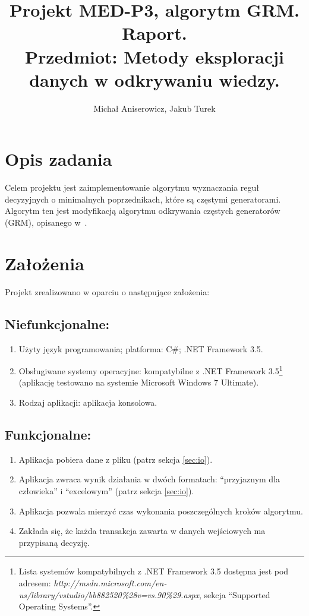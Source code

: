 \documentclass[a4paper,10pt]{article}
\title{Projekt MED-P3, algorytm GRM. Raport. \\ \small{Przedmiot: Metody eksploracji danych w odkrywaniu wiedzy.}}
\author{Michał Aniserowicz, Jakub Turek}
\date{}
\begin{document}
\maketitle

\section{Opis zadania} \label{sec:task_desc}
Celem projektu jest zaimplementowanie algorytmu wyznaczania reguł decyzyjnych o minimalnych poprzednikach, które są częstymi generatorami.
Algorytm ten jest modyfikacją algorytmu odkrywania częstych generatorów (GRM), opisanego w~\cite{grm}.



\section{Założenia} \label{sec:assumptions}
Projekt zrealizowano w oparciu o następujące założenia:

\subsection*{Niefunkcjonalne:}
 \begin{enumerate}
  \item Użyty język programowania; platforma: C\#; .NET Framework 3.5.
  \item Obsługiwane systemy operacyjne: kompatybilne z .NET Framework 3.5\footnote{Lista systemów kompatybilnych z .NET Framework 3.5 dostępna jest pod adresem: \emph{http://msdn.microsoft.com/en-us/library/vstudio/bb882520\%28v=vs.90\%29.aspx}, sekcja ``Supported Operating Systems''.} (aplikację testowano na systemie Microsoft Windows 7 Ultimate).
  \item Rodzaj aplikacji: aplikacja konsolowa.
\end{enumerate}

\subsection*{Funkcjonalne:}
 \begin{enumerate}
  \item Aplikacja pobiera dane z pliku (patrz sekcja \ref{sec:io}).
  \item Aplikacja zwraca wynik działania w dwóch formatach: ``przyjaznym dla człowieka'' i ``excelowym'' (patrz sekcja \ref{sec:io}).
  \item Aplikacja pozwala mierzyć czas wykonania poszczególnych kroków algorytmu.
  \item Zakłada się, że każda transakcja zawarta w danych wejściowych ma przypisaną decyzję.
 \end{enumerate}
\end{document}
